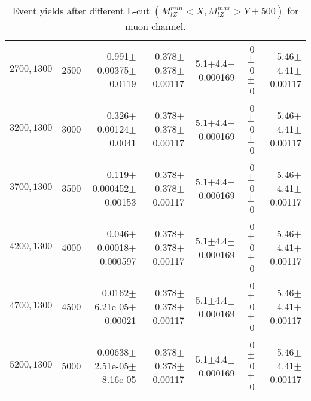 \documentclass[]{article}
\begin{document}
\begin{table}
\begin{center}
{\begin{tabular}{ |r|r|r|r|r|r|r|}
$2700,1300$ & 2500 & 0.991$\pm$0.00375$\pm$0.0119 & 0.378$\pm$0.378$\pm$0.00117 & 5.1$\pm$4.4$\pm$0.000169 & 0$\pm$0$\pm$0 & 5.46$\pm$4.41$\pm$0.00117 \\
$3200,1300$ & 3000 & 0.326$\pm$0.00124$\pm$0.0041 & 0.378$\pm$0.378$\pm$0.00117 & 5.1$\pm$4.4$\pm$0.000169 & 0$\pm$0$\pm$0 & 5.46$\pm$4.41$\pm$0.00117 \\
$3700,1300$ & 3500 & 0.119$\pm$0.000452$\pm$0.00153 & 0.378$\pm$0.378$\pm$0.00117 & 5.1$\pm$4.4$\pm$0.000169 & 0$\pm$0$\pm$0 & 5.46$\pm$4.41$\pm$0.00117 \\
$4200,1300$ & 4000 & 0.046$\pm$0.00018$\pm$0.000597 & 0.378$\pm$0.378$\pm$0.00117 & 5.1$\pm$4.4$\pm$0.000169 & 0$\pm$0$\pm$0 & 5.46$\pm$4.41$\pm$0.00117 \\
$4700,1300$ & 4500 & 0.0162$\pm$6.21e-05$\pm$0.00021 & 0.378$\pm$0.378$\pm$0.00117 & 5.1$\pm$4.4$\pm$0.000169 & 0$\pm$0$\pm$0 & 5.46$\pm$4.41$\pm$0.00117 \\
$5200,1300$ & 5000 & 0.00638$\pm$2.51e-05$\pm$8.16e-05 & 0.378$\pm$0.378$\pm$0.00117 & 5.1$\pm$4.4$\pm$0.000169 & 0$\pm$0$\pm$0 & 5.46$\pm$4.41$\pm$0.00117 \\
\hline 
\end{tabular}
}
\end{center}
\caption{Event yields after different L-cut $(M_{lZ}^{min} < X, M_{lZ}^{max} > Y + 500)$ for muon channel.}
\end{table}
\end{document}
